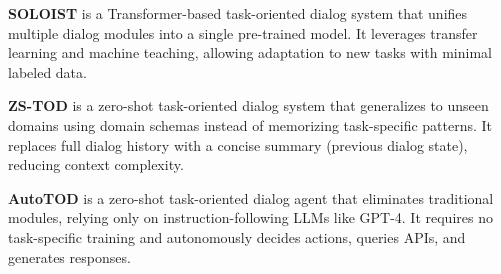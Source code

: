 
\textbf{SOLOIST} \cite{peng2021soloist} is a Transformer-based task-oriented dialog system that unifies multiple dialog modules into a single pre-trained model. It leverages transfer learning and machine teaching, allowing adaptation to new tasks with minimal labeled data.



\textbf{ZS-TOD} \cite{mosharrof2023zero} is a zero-shot task-oriented dialog system that generalizes to unseen domains using domain schemas instead of memorizing task-specific patterns. It replaces full dialog history with a concise summary (previous dialog state), reducing context complexity.


\textbf{AutoTOD} \cite{xu-etal-2024-rethinking} is a zero-shot task-oriented dialog agent that eliminates traditional modules, relying only on instruction-following LLMs like GPT-4. It requires no task-specific training and autonomously decides actions, queries APIs, and generates responses.
